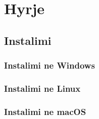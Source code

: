\chapter{Hyrje}

\section{Instalimi}

\subsection{Instalimi ne Windows}
\lipsum[1-3]

\subsection{Instalimi ne Linux}
\lipsum[1-3]

\subsection{Instalimi ne macOS}
\lipsum[1-3]